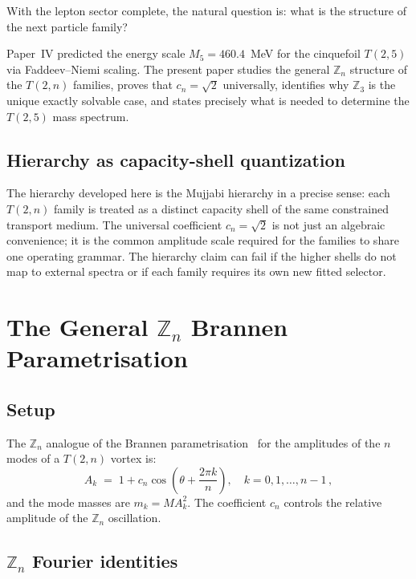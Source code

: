 \documentclass[11pt]{article}
\begin{document}
With the lepton sector complete, the natural question is: what is the structure
of the next particle family?

Paper~IV predicted the energy scale $M_5 = 460.4$~MeV for the cinquefoil
$T(2,5)$ via Faddeev--Niemi scaling.
The present paper studies the general $\mathbb{Z}_n$ structure of the
$T(2,n)$ families, proves that $c_n = \sqrt{2}$ universally, identifies
why $\mathbb{Z}_3$ is the unique exactly solvable case, and states precisely
what is needed to determine the $T(2,5)$ mass spectrum.

\subsection{Hierarchy as capacity-shell quantization}

The hierarchy developed here is the Mujjabi hierarchy in a precise sense: each
$T(2,n)$ family is treated as a distinct capacity shell of the same constrained
transport medium. The universal coefficient $c_n=\sqrt{2}$ is not just an
algebraic convenience; it is the common amplitude scale required for the
families to share one operating grammar. The hierarchy claim can fail if the
higher shells do not map to external spectra or if each family requires its own
new fitted selector.


\section{The General $\mathbb{Z}_n$ Brannen Parametrisation}
\label{sec:brannen}

\subsection{Setup}

The $\mathbb{Z}_n$ analogue of the Brannen parametrisation~\cite{Brannen2006}
for the amplitudes of the $n$ modes of a $T(2,n)$ vortex is:
\begin{equation}
  A_k \;=\; 1 + c_n \cos\!\left(\theta + \frac{2\pi k}{n}\right),
  \quad k = 0, 1, \ldots, n-1\,,
  \label{eq:Zn_brannen}
\end{equation}
and the mode masses are $m_k = M A_k^2$.
The coefficient $c_n$ controls the relative amplitude of the $\mathbb{Z}_n$
oscillation.

\subsection{$\mathbb{Z}_n$ Fourier identities}
\end{document}
